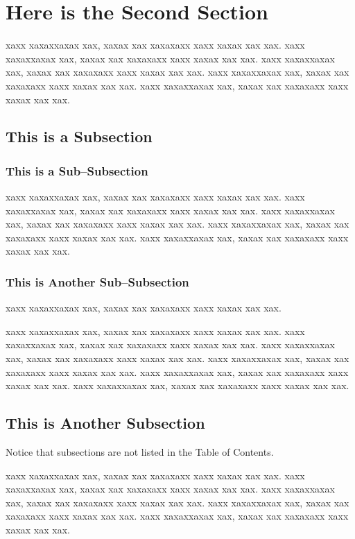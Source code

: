 \section{Here is the Second Section}

xaxx xaxaxxaxax xax, xaxax xax xaxaxaxx xaxx xaxax xax xax.
xaxx xaxaxxaxax xax, xaxax xax xaxaxaxx xaxx xaxax xax xax.
xaxx xaxaxxaxax xax, xaxax xax xaxaxaxx xaxx xaxax xax xax.
xaxx xaxaxxaxax xax, xaxax xax xaxaxaxx xaxx xaxax xax xax.
xaxx xaxaxxaxax xax, xaxax xax xaxaxaxx xaxx xaxax xax xax.

\subsection{This is a Subsection}

\subsubsection{This is a Sub--Subsection}

xaxx xaxaxxaxax xax, xaxax xax xaxaxaxx xaxx xaxax xax xax.
xaxx xaxaxxaxax xax, xaxax xax xaxaxaxx xaxx xaxax xax xax.
xaxx xaxaxxaxax xax, xaxax xax xaxaxaxx xaxx xaxax xax xax.
xaxx xaxaxxaxax xax, xaxax xax xaxaxaxx xaxx xaxax xax xax.
xaxx xaxaxxaxax xax, xaxax xax xaxaxaxx xaxx xaxax xax xax.

\subsubsection{This is Another Sub--Subsection}

xaxx xaxaxxaxax xax, xaxax xax xaxaxaxx xaxx xaxax xax xax.

xaxx xaxaxxaxax xax, xaxax xax xaxaxaxx xaxx xaxax xax xax.
xaxx xaxaxxaxax xax, xaxax xax xaxaxaxx xaxx xaxax xax xax.
xaxx xaxaxxaxax xax, xaxax xax xaxaxaxx xaxx xaxax xax xax.
xaxx xaxaxxaxax xax, xaxax xax xaxaxaxx xaxx xaxax xax xax.
xaxx xaxaxxaxax xax, xaxax xax xaxaxaxx xaxx xaxax xax xax.
xaxx xaxaxxaxax xax, xaxax xax xaxaxaxx xaxx xaxax xax xax.

\subsection{This is Another Subsection}

Notice that subsections are not listed in the Table of Contents.

xaxx xaxaxxaxax xax, xaxax xax xaxaxaxx xaxx xaxax xax xax.
xaxx xaxaxxaxax xax, xaxax xax xaxaxaxx xaxx xaxax xax xax.
xaxx xaxaxxaxax xax, xaxax xax xaxaxaxx xaxx xaxax xax xax.
xaxx xaxaxxaxax xax, xaxax xax xaxaxaxx xaxx xaxax xax xax.
xaxx xaxaxxaxax xax, xaxax xax xaxaxaxx xaxx xaxax xax xax.

